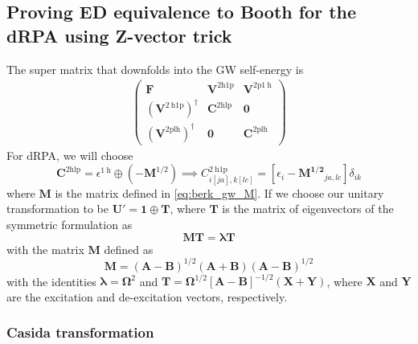 \subsection{Proving ED equivalence to Booth for the dRPA using Z-vector trick}
The super matrix that downfolds into the GW self-energy is
\begin{align}
\begin{pmatrix} \bm{F} & \bm{V}^{2 \mathrm{h1p}} & \bm{V}^{2 \mathrm{p} 1 \mathrm{~h}} \\ \left(\bm{V}^{2 \mathrm{~h} 1 \mathrm{p}}\right)^{\dagger} & \bm{C}^{2 \mathrm{hlp}} & \bm{0} \\ \left(\bm{V}^{2 \mathrm{plh}}\right)^{\dagger} & \bm{0} & \bm{C}^{2 \mathrm{plh}} \end{pmatrix}
\end{align}
For dRPA, we will choose 
\begin{equation}
    \bm{C}^{2 \mathrm{hlp}} = \epsilon^{1 \mathrm{~h}} \oplus (-\bm{M}^{1/2})
\implies C_{i[j a], k[l c]}^{2 \mathrm{~h} 1 \mathrm{p}} = \left[\epsilon _i - \bm{M^{1/2}}_{ja,lc}\right] \delta_{i k}
\end{equation}
 where $\bm{M}$ is the matrix defined in \eqref{eq:berk_gw_M}.
If we choose our unitary transformation to be $\bm{U'} = \bm{1} \oplus \bm{T}$, where $\bm{T}$ is the matrix of eigenvectors of the symmetric formulation as 
\begin{equation}
    \bm{M}\bm{T}= \bm{\lambda } \bm{T}
\label{eq:berk_gw_eigenproblem}
\end{equation}
with the matrix $\bm{M}$ defined as
\begin{equation}
    \bm{M}=(\bm{A}-\bm{B})^{1 / 2}(\bm{A}+\bm{B})(\bm{A}-\bm{B})^{1 / 2}
\label{eq:berk_gw_M}
\end{equation}
with the identities $\bm{\lambda } = \bm{\Omega }^2$ and $\bm{T} = \bm{\Omega }^{1/2} \left[\bm{A}-\bm{B}\right]^{-1/2}\left(\bm{X} + \bm{Y}\right)$, where $\bm{X}$ and $\bm{Y}$ are the excitation and de-excitation vectors, respectively. 
\subsubsection{Casida transformation}

